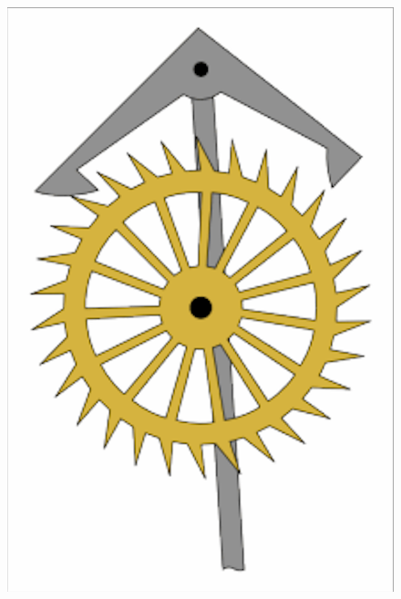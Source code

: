 \begin{figure}[htb]
\includegraphics[trim=2 2 2 2,clip,scale=0.3]{./Bilder/Anker_27.png}

\end{figure}
